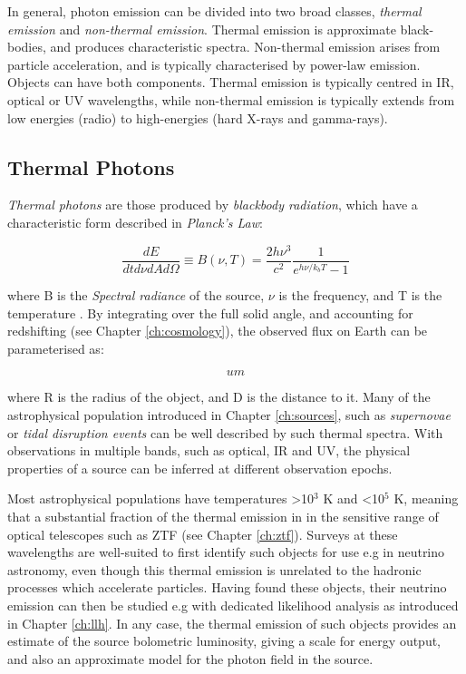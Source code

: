 In general, photon emission can be divided into two broad classes, \emph{thermal emission} and \emph{non-thermal emission}. Thermal emission is approximate black-bodies, and produces characteristic spectra. Non-thermal emission arises from particle acceleration, and is typically characterised by power-law emission. Objects can have both components. Thermal emission is typically centred in IR, optical or UV wavelengths, while non-thermal emission is typically extends from low energies (radio) to high-energies (hard X-rays and gamma-rays).
 
 \subsection*{Thermal Photons}
 
 \emph{Thermal photons} are those produced by \emph{blackbody radiation}, which have a characteristic form described in \emph{Planck's Law}:
 
 \begin{equation}
 	\frac{dE}{dt d\nu dA d\Omega} \equiv B(\nu, T) = \frac{2h\nu^{3}}{c^{2}} \frac{1}{e^{h\nu/k_{b}T} -1}
 \end{equation}

where B is the \emph{Spectral radiance} of the source, $\nu$ is the frequency, and T is the temperature . By integrating over the full solid angle, and accounting for redshifting (see Chapter \ref{ch:cosmology}), the observed flux on Earth can be parameterised as:

\begin{equation}
	um
\end{equation}

where R is the radius of the object, and D is the distance to it. Many of the astrophysical population introduced in Chapter \ref{ch:sources}, such as \emph{supernovae} or \emph{tidal disruption events} can be well described by such thermal spectra. With observations in multiple bands, such as optical, IR and UV, the physical properties of a source can be inferred at different observation epochs. 

Most astrophysical populations have temperatures >10$^{3}$ K and <10$^{5}$ K, meaning that a substantial fraction of the thermal emission in in the sensitive range of optical telescopes such as ZTF (see Chapter \ref{ch:ztf}). Surveys at these wavelengths are well-suited to first identify such objects for use e.g in neutrino astronomy, even though this thermal emission is unrelated to the hadronic processes which accelerate particles. Having found these objects, their neutrino emission can then be studied e.g with dedicated likelihood analysis as introduced in Chapter \ref{ch:llh}. In any case, the thermal emission of such objects provides an estimate of the source bolometric luminosity, giving a scale for energy output, and also an approximate model for the photon field in the source.

